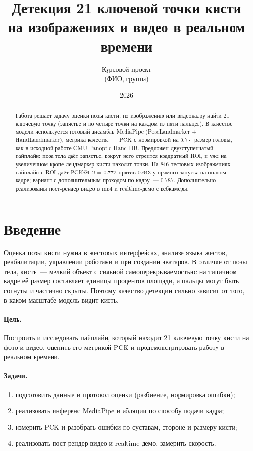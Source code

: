 \documentclass[11pt,a4paper]{article}
\title{Детекция 21 ключевой точки кисти\\на изображениях и видео в реальном времени}
\author{Курсовой проект\\[2pt] \normalsize (ФИО, группа)}
\date{2026}
\newcommand{\Ntest}{846}
\newcommand{\PckFull}{0.643}
\newcommand{\PckPose}{0.772}
\newcommand{\PckPoseFull}{0.787}
\begin{document}
\maketitle

\begin{abstract}
\noindent
Работа решает задачу оценки позы кисти: по изображению или видеокадру найти
21 ключевую точку (запястье и по четыре точки на каждом из пяти пальцев).
В качестве модели используется готовый ансамбль MediaPipe (PoseLandmarker +
HandLandmarker), метрика качества~--- PCK с нормировкой на \(0.7\cdot\)~размер
головы, как в исходной работе CMU Panoptic Hand DB. Предложен двухступенчатый
пайплайн: поза тела даёт запястье, вокруг него строится квадратный ROI,
и уже на увеличенном кропе лендмаркер кисти находит точки. На \Ntest{}
тестовых изображениях пайплайн с ROI даёт PCK@0.2 = \PckPose{} против
\PckFull{} у прямого запуска на полном кадре; вариант с дополнительным проходом
по кадру~--- \PckPoseFull{}. Дополнительно реализованы пост-рендер видео в mp4
и realtime-демо с вебкамеры.
\end{abstract}

\tableofcontents
\newpage

\section{Введение}

Оценка позы кисти нужна в жестовых интерфейсах, анализе языка жестов,
реабилитации, управлении роботами и при создании аватаров. В отличие от позы
тела, кисть~--- мелкий объект с сильной самоперекрываемостью: на типичном
кадре её размер составляет единицы процентов площади, а пальцы могут быть
согнуты и частично скрыты. Поэтому качество детекции сильно зависит от того,
в каком масштабе модель видит кисть.

\paragraph{Цель.} Построить и исследовать пайплайн, который находит 21 ключевую
точку кисти на фото и видео, оценить его метрикой PCK и продемонстрировать
работу в реальном времени.

\paragraph{Задачи.}
\begin{enumerate}
  \item подготовить данные и протокол оценки (разбиение, нормировка ошибки);
  \item реализовать инференс MediaPipe и абляции по способу подачи кадра;
  \item измерить PCK и разобрать ошибки по суставам, стороне и размеру кисти;
  \item реализовать пост-рендер видео и realtime-демо, замерить скорость.
\end{enumerate}
\end{document}
